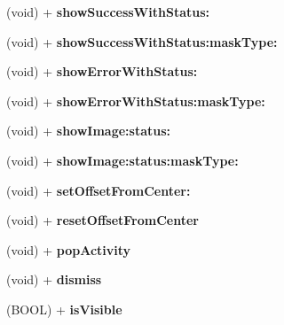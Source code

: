 \begin{DoxyCompactItemize}
(void) + {\bfseries show\+Success\+With\+Status\+:}
\item 
\mbox{\label{interface_s_v_progress_h_u_d_a2ee763f36bd41012f6c38a58aad92252}} 
(void) + {\bfseries show\+Success\+With\+Status\+:mask\+Type\+:}
\item 
\mbox{\label{interface_s_v_progress_h_u_d_a8128a4e1addbb9e840fc308dc0321753}} 
(void) + {\bfseries show\+Error\+With\+Status\+:}
\item 
\mbox{\label{interface_s_v_progress_h_u_d_ae3fddc19857ad2352b997f3867d11cf4}} 
(void) + {\bfseries show\+Error\+With\+Status\+:mask\+Type\+:}
\item 
\mbox{\label{interface_s_v_progress_h_u_d_a9247d6fec57607765c3afa43a897d5b2}} 
(void) + {\bfseries show\+Image\+:status\+:}
\item 
\mbox{\label{interface_s_v_progress_h_u_d_a70f7fe07899b0820895caa2f7ab8eefd}} 
(void) + {\bfseries show\+Image\+:status\+:mask\+Type\+:}
\item 
\mbox{\label{interface_s_v_progress_h_u_d_a7dbb68407c09cde2392da28dee66459f}} 
(void) + {\bfseries set\+Offset\+From\+Center\+:}
\item 
\mbox{\label{interface_s_v_progress_h_u_d_a6a77bb5e66a35e649e8abd9d2a801866}} 
(void) + {\bfseries reset\+Offset\+From\+Center}
\item 
\mbox{\label{interface_s_v_progress_h_u_d_a760194f4076a9371fd2a749c097d070e}} 
(void) + {\bfseries pop\+Activity}
\item 
\mbox{\label{interface_s_v_progress_h_u_d_aed897a5b64a03fea94b402edef361f55}} 
(void) + {\bfseries dismiss}
\item 
\mbox{\label{interface_s_v_progress_h_u_d_a2d37e07a5739b10d9429bd1dbaa0206c}} 
(B\+O\+OL) + {\bfseries is\+Visible}
\item 

\end{DoxyCompactItemize}

